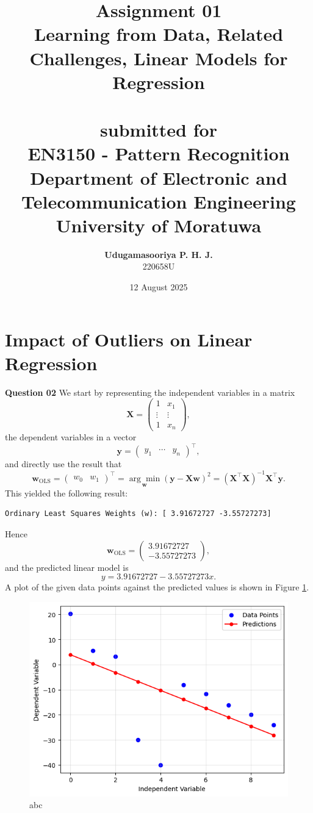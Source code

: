 \documentclass{article}[a4paper]
\title{
	\huge{\textbf{
		Assignment 01
	}}\\
	\Large{
		Learning from Data, Related Challenges, Linear Models for Regression
	}\\
	\large{\phantom{}}\\
	\large{
		submitted for
	}\\
	\LARGE{
		\textbf{EN3150 - Pattern Recognition}
	}\\
	\large{
		Department of Electronic and Telecommunication Engineering
	}
	\\
	\large{University of Moratuwa}
}
\author{
	\textbf{Udugamasooriya P. H. J.}\\
	220658U %
}
\date{12 August 2025}
\begin{document}
	\maketitle

	\section{Impact of Outliers on Linear Regression}

	\textbf{Question 02}
	We start by representing the independent variables in a matrix \[
		\mathbf{X} = \begin{pmatrix}
			1		& x_1		\\
			\vdots	& \vdots	\\
			1		& x_n
		\end{pmatrix},
	\] the dependent variables in a vector \[
		\mathbf{y} = \begin{pmatrix}
			y_1 & \cdots & y_n
		\end{pmatrix} ^ \top,
	\] and directly use the result that \[
		\mathbf{w}_\text{OLS}
		=
		\begin{pmatrix} w_0 & w_1 \end{pmatrix} ^ \top
		=
		\underset{\mathbf{w}}{\arg\min}
		\left( \mathbf{y} - \mathbf{X} \mathbf{w} \right)^2
		=
		\left( \mathbf{X}^\top \mathbf{X} \right)^{-1} \mathbf{X}^\top \mathbf{y}.
	\] This yielded the following result:
	\begin{lstlisting}
Ordinary Least Squares Weights (w): [ 3.91672727 -3.55727273]
	\end{lstlisting}
	Hence \[
		\mathbf{w}_\text{OLS} = \begin{pmatrix} 3.91672727 \\ -3.55727273 \end{pmatrix},
	\] and the predicted linear model is \[
		y = 3.91672727 - 3.55727273 x.
	\]
	A plot of the given data points against the predicted values is shown in Figure \ref{q1}.

	\begin{figure}[H]
		\centering
		\includegraphics[width=0.7\linewidth]{images/q1.png}
		\caption{abc}
		\label{q1}
	\end{figure}
\end{document}
